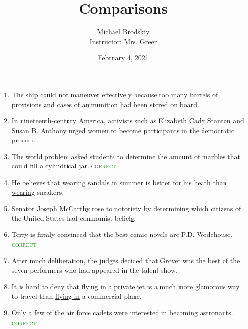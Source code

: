 \documentclass[12pt]{article}
\title{Comparisons}
\date{February 4, 2021}
\author{Michael Brodskiy\\ \small Instructor: Mrs. Greer}
\begin{document}
    \maketitle

    \begin{enumerate}

        \begin{center}
          Fix the comparison error, if necessary
        \end{center}

      \item The ship could not maneuver effectively because too  \underline{many} barrels of provisions and cases of ammunition had been stored on board.

      \item In nineteenth-century America, activists such as Elizabeth Cady Stanton and Susan B. Anthony urged women to become  \underline{participants} in the democratic process.

      \item The world problem asked students to determine the amount of marbles that could fill a cylindrical jar. \textcolor{green}{\textsc{correct}}

      \item He believes that wearing sandals in summer is better for his heath than \underline{wearing} sneakers.

      \item Senator Joseph McCarthy rose to notoriety by determining which citizens of the United States had  communist belief\underline{s}. 

      \item Terry is firmly convinced that the best comic novels are P.D. Wodehouse. \textcolor{green}{\textsc{correct}}

      \item After much deliberation, the judges decided that Grover was the  \underline{best} of the seven performers who had appeared in the talent show.

      \item It is hard to deny that flying in a private jet is a much more glamorous way to travel than \underline{flying in} a commercial plane.

      \item Only a few of the air force cadets were interested in becoming astronauts. \textcolor{green}{\textsc{correct}}


\end{enumerate}
\end{document}
